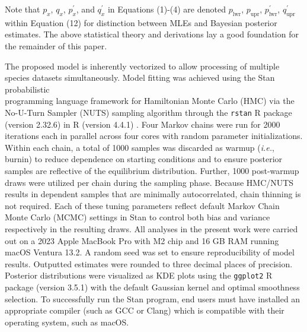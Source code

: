 \documentclass[12pt]{article}
\begin{document}
\noindent Note that $p_x$, $q_x$, $p^{'}_x$, and $q^{'}_x$ in Equations (1)-(4) are denoted $p_\mathrm{lwr}$, $p_\mathrm{upr}$, $p^{'}_\mathrm{lwr}$, $q^{'}_\mathrm{upr}$ within Equation (12) for distinction between MLEs and Bayesian posterior estimates. The above statistical theory and derivations lay a good foundation for the remainder of this paper.

The proposed model is inherently vectorized to allow processing of multiple species datasets simultaneously. Model fitting was achieved using the Stan probabilistic \\ programming language \citep{carpenter2017stan} framework for Hamiltonian Monte Carlo (HMC) via the No-U-Turn Sampler (NUTS) sampling algorithm \citep{hoffman2014no} through the {\tt rstan} R package (version 2.32.6) \citep{stan2023rstan} in R (version 4.4.1) \citep{rcore2024language}. Four Markov chains were run for 2000 iterations each in parallel across four cores with random parameter initializations. Within each chain, a total of 1000 samples was discarded as warmup (\textit{i.e.}, burnin) to reduce dependence on starting conditions and to ensure posterior samples are reflective of the equilibrium distribution. Further, 1000 post-warmup draws were utilized per chain during the sampling phase. Because HMC/NUTS results in dependent samples that are minimally autocorrelated, chain thinning is not required. Each of these tuning parameters reflect default Markov Chain Monte Carlo (MCMC) settings in Stan to control both bias and variance respectively in the resulting draws. All analyses in the present work were carried out on a 2023 Apple MacBook Pro with M2 chip and 16 GB RAM running macOS Ventura 13.2. A random seed was set to ensure reproducibility of model results. Outputted estimates were rounded to three decimal places of precision. Posterior distributions were visualized as KDE plots using the {\tt ggplot2} R package (version 3.5.1) \citep{wickham2016ggplot2} with the default Gaussian kernel and optimal smoothness selection. To successfully run the Stan program, end users must have installed an appropriate compiler (such as GCC or Clang) which is compatible with their operating system, such as macOS.
\end{document}
